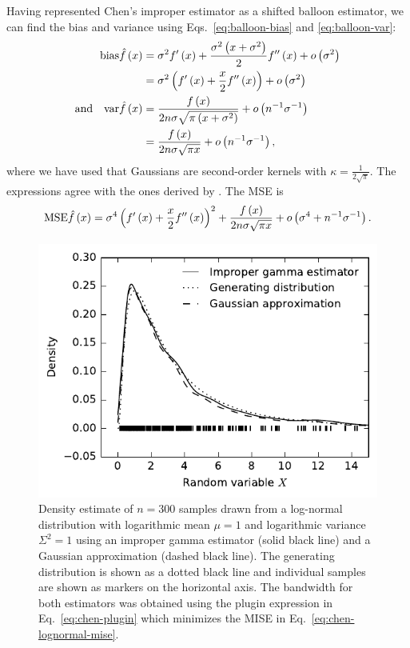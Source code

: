 Having represented Chen's improper estimator as a shifted balloon estimator, we can find the bias and variance using Eqs.~\eqref{eq:balloon-bias} and \eqref{eq:balloon-var}:
\begin{align*}
\bias\hat{f}\left(x\right) & =\sigma^{2}f'\left(x\right)+\frac{\sigma^{2}\left(x+\sigma^{2}\right)}{2}f''\left(x\right)+o\left(\sigma^{2}\right)\\
 & =\sigma^{2}\left(f'\left(x\right)+\frac{x}{2}f''\left(x\right)\right)+o\left(\sigma^{2}\right)\\
\text{and}\quad\var\hat{f}\left(x\right) & =\frac{f\left(x\right)}{2n\sigma\sqrt{\pi\left(x+\sigma^{2}\right)}}+o\left(n^{-1}\sigma^{-1}\right)\\
 & =\frac{f\left(x\right)}{2n\sigma\sqrt{\pi x}}+o\left(n^{-1}\sigma^{-1}\right),
\end{align*}
where we have used that Gaussians are second-order kernels with $\kappa=\frac{1}{2\sqrt{\pi}}$. The expressions agree with the ones derived by \citet{Chen2000}. The MSE is
\[
\mathrm{MSE}\hat{f}\left(x\right)=\sigma^{4}\left(f'\left(x\right)+\frac{x}{2}f''\left(x\right)\right)^{2}+\frac{f\left(x\right)}{2n\sigma\sqrt{\pi x}}+o\left(\sigma^{4}+n^{-1}\sigma^{-1}\right).
\]


\begin{figure}
\begin{centering}
\includegraphics{improper-gamma}
\par\end{centering}

\caption{\label{fig:improper-gamma}Density estimate of $n=300$ samples drawn from a log-normal distribution with logarithmic mean $\mu=1$ and logarithmic variance $\Sigma^{2}=1$ using an improper gamma estimator (solid black line) and a Gaussian approximation (dashed black line). The generating distribution is shown as a dotted black line and individual samples are shown as markers on the horizontal axis. The bandwidth for both estimators was obtained using the plugin expression in Eq.~\eqref{eq:chen-plugin} which minimizes the MISE in Eq.~\eqref{eq:chen-lognormal-mise}.}
\end{figure}


